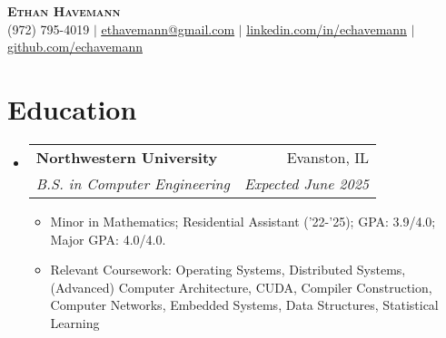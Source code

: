 \documentclass[letterpaper,11pt]{article}
\makeatletter
\newcommand{\resumeItem}[1]{
  \item\small{
    {#1 \vspace{-2pt}}
  }
}
\newcommand{\resumeSubheading}[4]{
  \vspace{-2pt}\item
    \begin{tabular*}{0.97\textwidth}[t]{l@{\extracolsep{\fill}}r}
      \textbf{#1} & #2 \\
      \textit{\small#3} & \textit{\small #4} \\
    \end{tabular*}\vspace{-7pt}
}
\newcommand{\resumeSubHeadingListStart}{\begin{itemize}[leftmargin=0.15in, label={}]}
\newcommand{\resumeSubHeadingListEnd}{\end{itemize}}
\newcommand{\resumeItemListStart}{\begin{itemize}}
\newcommand{\resumeItemListEnd}{\end{itemize}\vspace{-5pt}}
\makeatother
\begin{document}


\begin{center}
    \textbf{\Huge \scshape Ethan Havemann} \\ \vspace{1pt}
    \small (972) 795-4019 $|$ \href{mailto:ethavemann@gmail.com}{\underline{ethavemann@gmail.com}} $|$ 
    \href{https://linkedin.com/in/echavemann}{\underline{linkedin.com/in/echavemann}} $|$
    \href{https://github.com/echavemann}{\underline{github.com/echavemann}}
\end{center}
\section{Education}
  \resumeSubHeadingListStart
    \resumeSubheading
      {Northwestern University}{Evanston, IL}
      {B.S. in Computer Engineering}{Expected June 2025}
      \resumeItemListStart
          \resumeItem{Minor in Mathematics; Residential Assistant ('22-'25); GPA: 3.9/4.0; Major GPA: 4.0/4.0.}
          \resumeItem{Relevant Coursework: Operating Systems, Distributed Systems, (Advanced) Computer Architecture, CUDA, Compiler Construction, Computer Networks, Embedded Systems, Data Structures, Statistical Learning }
      \resumeItemListEnd
  \resumeSubHeadingListEnd
\end{document}
